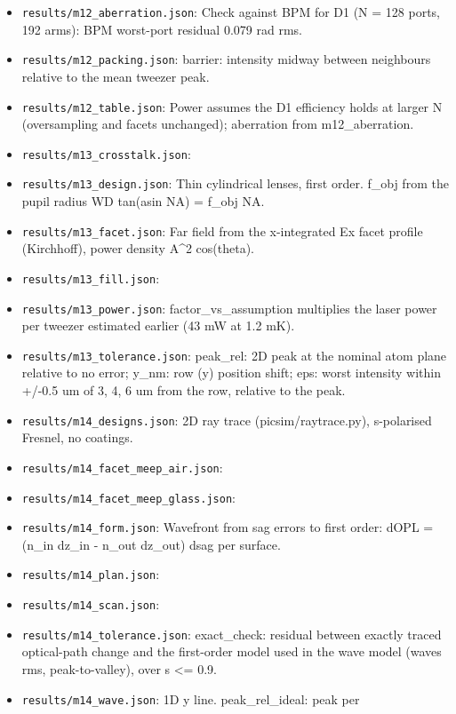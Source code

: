 \begin{itemize}
\item
  \texttt{results/m12\_aberration.json}: Check against BPM for D1 (N =
  128 ports, 192 arms): BPM worst-port residual 0.079 rad rms.
\item
  \texttt{results/m12\_packing.json}: barrier: intensity midway between
  neighbours relative to the mean tweezer peak.
\item
  \texttt{results/m12\_table.json}: Power assumes the D1 efficiency
  holds at larger N (oversampling and facets unchanged); aberration from
  m12\_aberration.
\item
  \texttt{results/m13\_crosstalk.json}:
\item
  \texttt{results/m13\_design.json}: Thin cylindrical lenses, first
  order. f\_obj from the pupil radius WD tan(asin NA) = f\_obj NA.
\item
  \texttt{results/m13\_facet.json}: Far field from the x-integrated Ex
  facet profile (Kirchhoff), power density \textbar A\textbar\^{}2
  cos(theta).
\item
  \texttt{results/m13\_fill.json}:
\item
  \texttt{results/m13\_power.json}: factor\_vs\_assumption multiplies
  the laser power per tweezer estimated earlier (43 mW at 1.2 mK).
\item
  \texttt{results/m13\_tolerance.json}: peak\_rel: 2D peak at the
  nominal atom plane relative to no error; y\_nm: row (y) position
  shift; eps: worst intensity within +/-0.5 um of 3, 4, 6 um from the
  row, relative to the peak.
\item
  \texttt{results/m14\_designs.json}: 2D ray trace (picsim/raytrace.py),
  s-polarised Fresnel, no coatings.
\item
  \texttt{results/m14\_facet\_meep\_air.json}:
\item
  \texttt{results/m14\_facet\_meep\_glass.json}:
\item
  \texttt{results/m14\_form.json}: Wavefront from sag errors to first
  order: dOPL = (n\_in dz\_in - n\_out dz\_out) dsag per surface.
\item
  \texttt{results/m14\_plan.json}:
\item
  \texttt{results/m14\_scan.json}:
\item
  \texttt{results/m14\_tolerance.json}: exact\_check: residual between
  exactly traced optical-path change and the first-order model used in
  the wave model (waves rms, peak-to-valley), over \textbar s\textbar{}
  \textless= 0.9.
\item
  \texttt{results/m14\_wave.json}: 1D y line. peak\_rel\_ideal: peak per

\end{itemize}
